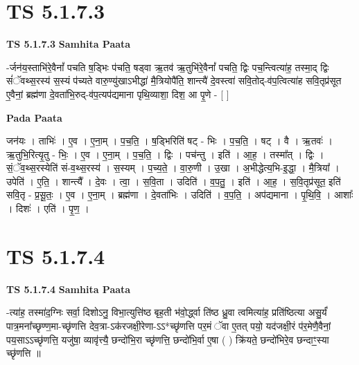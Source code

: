 \documentclass[17pt]{extarticle}
\begin{document}

\section{ TS 5.1.7.3 }

\textbf{TS 5.1.7.3 } \newline
\textbf{Samhita Paata} \newline

-र्जन॑य॒स्ताभि॑रे॒वैनां᳚ पचति ष॒ड्भिः प॑चति॒ षड्वा ऋ॒तव॑ ऋ॒तुभि॑रे॒वैनां᳚ पचति॒ द्विः पच॒न्त्वित्या॑ह॒ तस्मा॒द् द्विः सं॑ॅवथ्स॒रस्य॑ स॒स्यं प॑च्यते वारु॒ण्यु॑खाऽभीद्धा॑ मै॒त्रियोपै॑ति॒ शान्त्यै॑ दे॒वस्त्वा॑ सवि॒तोद्-व॑प॒त्वित्या॑ह सवि॒तृप्र॑सूत ए॒वैनां॒ ब्रह्म॑णा दे॒वता॑भि॒रुद्-व॑प॒त्यप॑द्यमाना पृथि॒व्याशा॒ दिश॒ आ पृ॒णे - [  ] \newline

\textbf{Pada Paata} \newline

जन॑यः । ताभिः॑ । ए॒व । ए॒ना॒म् । प॒च॒ति॒ । ष॒ड्भिरिति॑ षट् - भिः । प॒च॒ति॒ । षट् । वै । ऋ॒तवः॑ । ऋ॒तुभि॒रित्यृ॒तु - भिः॒ । ए॒व । ए॒ना॒म् । प॒च॒ति॒ । द्विः । पच॑न्तु । इति॑ । आ॒ह॒ । तस्मा᳚त् । द्विः । सं॒ॅव॒थ्स॒रस्येति॑ सं-व॒थ्स॒रस्य॑ । स॒स्यम् । प॒च्य॒ते॒ । वा॒रु॒णी । उ॒खा । अ॒भीद्धेत्य॒भि-इ॒द्धा॒ । मै॒त्रिया᳚ । उपेति॑ । ए॒ति॒ । शान्त्यै᳚ । दे॒वः । त्वा॒ । स॒वि॒ता । उदिति॑ । व॒प॒तु॒ । इति॑ । आ॒ह॒ । स॒वि॒तृप्र॑सूत॒ इति॑ सवि॒तृ - प्र॒सू॒तः॒ । ए॒व । ए॒ना॒म् । ब्रह्म॑णा । दे॒वता॑भिः । उदिति॑ । व॒प॒ति॒ । अप॑द्यमाना । पृ॒थि॒वि॒ । आशाः᳚ । दिशः॑ । एति॑ । पृ॒ण॒ ।  \newline





\section{ TS 5.1.7.4 }

\textbf{TS 5.1.7.4 } \newline
\textbf{Samhita Paata} \newline

-त्या॑ह॒ तस्मा॑द॒ग्निः सर्वा॒ दिशोऽनु॒ विभा॒त्युत्ति॑ष्ठ बृह॒ती भ॑वो॒र्द्ध्वा ति॑ष्ठ ध्रु॒वा त्वमित्या॑ह॒ प्रति॑ष्ठित्या असु॒र्यं॑ पात्र॒मना᳚च्छृण्ण॒मा-च्छृ॑णत्ति देव॒त्रा-ऽक॑रजक्षी॒रेणा-ऽऽ*च्छृ॑णत्ति पर॒मं ॅवा ए॒तत् पयो॒ यद॑जक्षी॒रं प॑र॒मेणै॒वैनां॒ पय॒साऽऽच्छृ॑णत्ति॒ यजु॑षा॒ व्यावृ॑त्त्यै॒ छन्दो॑भि॒रा च्छृ॑णत्ति॒ छन्दो॑भि॒र्वा ए॒षा ( ) क्रि॑यते॒ छन्दो॑भिरे॒व छन्दाꣳ॒॒स्या च्छृ॑णत्ति ॥ \newline
\end{document}
